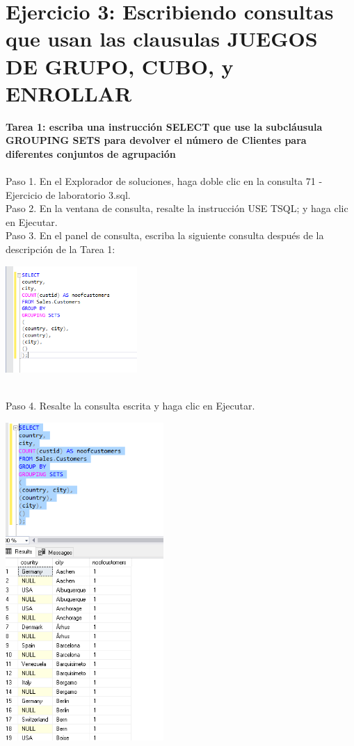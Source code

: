 \section{Ejercicio 3: Escribiendo consultas que usan las clausulas JUEGOS DE GRUPO, CUBO, y ENROLLAR} 
\begin{flushleft}
\textbf{Tarea 1: escriba una instrucción SELECT que use la subcláusula GROUPING SETS para devolver el número de Clientes para diferentes conjuntos de agrupación}
\textbf{}\\
\textbf{}\\
Paso 1. En el Explorador de soluciones, haga doble clic en la consulta 71 - Ejercicio de laboratorio 3.sql.
\textbf{}\\
Paso 2. En la ventana de consulta, resalte la instrucción USE TSQL; y haga clic en Ejecutar.
\textbf{}\\


Paso 3. En el panel de consulta, escriba la siguiente consulta después de la descripción de la Tarea 1:
\begin{center}
	\includegraphics[width=5cm]{./Imagenes/6img1} 
	\end{center}

\textbf{}\\
Paso 4. Resalte la consulta escrita y haga clic en Ejecutar.
\begin{center}
	\includegraphics[width=6cm]{./Imagenes/6img2} 
	\end{center}
\textbf{}\\
\textbf{}\\



\end{flushleft}
